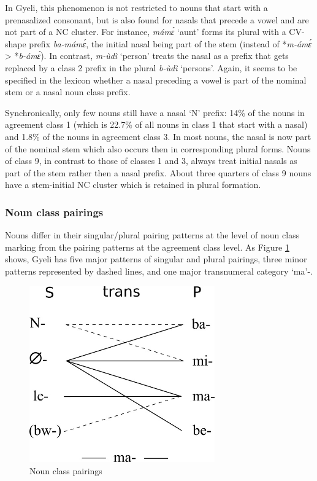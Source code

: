 In Gyeli, this phenomenon is not restricted to nouns that start with a prenasalized consonant, but is also found for nasals that precede a vowel and are not part of a NC cluster. For instance, {\itshape mámɛ́} `aunt' forms its plural with a CV- shape prefix {\itshape ba-mámɛ́}, the initial nasal being part of the stem (instead of *{\itshape m-ámɛ́} > *{\itshape b-ámɛ́}). In contrast, {\itshape m-ùdì} `person' treats the nasal as a prefix that gets replaced by a class 2 prefix in the plural {\itshape b-ùdì} `persons'. Again, it seems to be specified in the lexicon whether a nasal preceding a vowel is part of the nominal stem or a nasal noun class prefix.

Synchronically, only few nouns still have a nasal `N' prefix: 14\% of the nouns in agreement class 1 (which is 22.7\% of all nouns in class 1 that start with a nasal) and 1.8\% of the nouns in agreement class 3.  In most nouns, the nasal is now part of the nominal stem which also occurs then in corresponding plural forms.  Nouns of class 9, in contrast to those of classes 1 and 3, always treat initial nasals as part of the stem rather then a nasal prefix.  About three quarters of class 9 nouns have a stem-initial NC cluster which is retained in plural formation.

\subsubsection{Noun class pairings}

Nouns differ in their singular/plural pairing patterns at the level of noun class marking from the pairing patterns at the agreement class level. As Figure \ref{Fig:NCs} shows, Gyeli has five major patterns of singular and plural pairings, three minor patterns represented by dashed lines, and one major transnumeral category `ma'-. 

\begin{figure} 
\centering
\includegraphics[width=8cm]{figures/Gyeli-NC-system.jpg}
\caption{Noun class pairings}
\label{Fig:NCs}
\end{figure}

